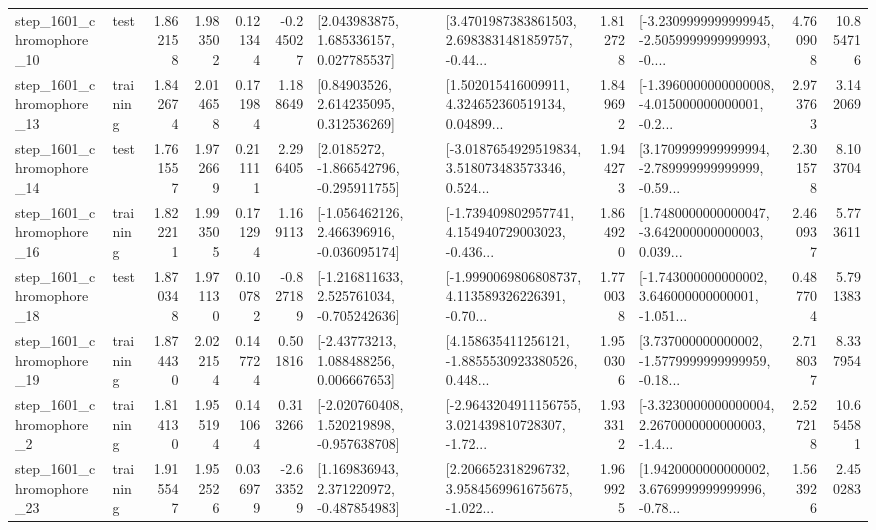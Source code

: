 \begin{tabular}{llrrrrllrlrr}
 step\_1601\_chromophore\_10 &      test &      1.862158 &    1.983502 &      0.121344 & -0.245027 &     [2.043983875, 1.685336157, 0.027785537] &  [3.4701987383861503, 2.6983831481859757, -0.44... &       1.812728 &  [-3.2309999999999945, -2.5059999999999993, -0.... &            4.760908 &         10.854716 \\
 step\_1601\_chromophore\_13 &  training &      1.842674 &    2.014658 &      0.171984 &  1.188649 &      [0.84903526, 2.614235095, 0.312536269] &  [1.502015416009911, 4.324652360519134, 0.04899... &       1.849692 &  [-1.3960000000000008, -4.015000000000001, -0.2... &            2.973763 &          3.142069 \\
 step\_1601\_chromophore\_14 &      test &      1.761557 &    1.972669 &      0.211111 &  2.296405 &     [2.0185272, -1.866542796, -0.295911755] &  [-3.0187654929519834, 3.518073483573346, 0.524... &       1.944273 &  [3.1709999999999994, -2.789999999999999, -0.59... &            2.301578 &          8.103704 \\
 step\_1601\_chromophore\_16 &  training &      1.822211 &    1.993505 &      0.171294 &  1.169113 &   [-1.056462126, 2.466396916, -0.036095174] &  [-1.739409802957741, 4.154940729003023, -0.436... &       1.864920 &  [1.7480000000000047, -3.642000000000003, 0.039... &            2.460937 &          5.773611 \\
 step\_1601\_chromophore\_18 &      test &      1.870348 &    1.971130 &      0.100782 & -0.827189 &   [-1.216811633, 2.525761034, -0.705242636] &  [-1.9990069806808737, 4.113589326226391, -0.70... &       1.770038 &  [-1.743000000000002, 3.646000000000001, -1.051... &            0.487704 &          5.791383 \\
 step\_1601\_chromophore\_19 &  training &      1.874430 &    2.022154 &      0.147724 &  0.501816 &     [-2.43773213, 1.088488256, 0.006667653] &  [4.158635411256121, -1.8855530923380526, 0.448... &       1.950306 &  [3.737000000000002, -1.5779999999999959, -0.18... &            2.718037 &          8.337954 \\
  step\_1601\_chromophore\_2 &  training &      1.814130 &    1.955194 &      0.141064 &  0.313266 &   [-2.020760408, 1.520219898, -0.957638708] &  [-2.9643204911156755, 3.021439810728307, -1.72... &       1.933312 &  [-3.3230000000000004, 2.2670000000000003, -1.4... &            2.527218 &         10.654581 \\
 step\_1601\_chromophore\_23 &  training &      1.915547 &    1.952526 &      0.036979 & -2.633529 &    [1.169836943, 2.371220972, -0.487854983] &  [2.206652318296732, 3.9584569961675675, -1.022... &       1.969925 &  [1.9420000000000002, 3.6769999999999996, -0.78... &            1.563926 &          2.450283 \\

\end{tabular}
